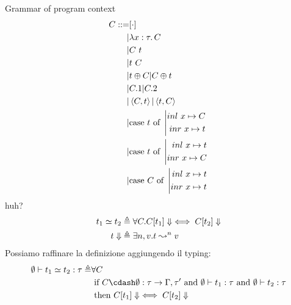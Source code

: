 \documentclass{article}
\begin{document}
Grammar of program context
\begin{align*}
    C ::= & [\cdot] \\
    |& \lambda x:\tau\ldotp C \\
    |& C\ t \\
    |& t\ C \\
    |& t\oplus C | C\oplus t \\
    |& C.1 | C.2 \\
    |& \left\langle C,t\right\rangle | \left\langle t,C\right\rangle \\
    |& \text{case}\ t\ \text{of}\ \left|\begin{aligned}{inl}~x\mapsto C\\{inr}~x\mapsto t\end{aligned}\right. \\
    |& \text{case}\ t\ \text{of}\ \left|\begin{aligned}{inl}~x\mapsto t\\{inr}~x\mapsto C\end{aligned}\right. \\
    |& \text{case}\ C\ \text{of}\ \left|\begin{aligned}{inl}~x\mapsto t\\{inr}~x\mapsto t\end{aligned}\right. \\
\end{align*}
huh?
\begin{align*}
    t_1\simeq t_2 &\triangleq \forall C. C[t_1] \Downarrow \iff C[t_2]\Downarrow \\
    t\Downarrow &\triangleq \exists n,v.t\leadsto^n v
\end{align*}
Possiamo raffinare la definizione aggiungendo il typing:
\begin{align*}
    \emptyset \vdash t_1\simeq t_2:\tau \triangleq& \forall C \\
                                                  &\IF C\cdash \emptyset : \tau\to\Gamma,\tau' \AND \emptyset \vdash t_1:\tau \AND \emptyset \vdash t_2:\tau \\
                                                  &\THEN C[t_1]\Da \iff C[t_2]\Da
\end{align*}
\end{document}
